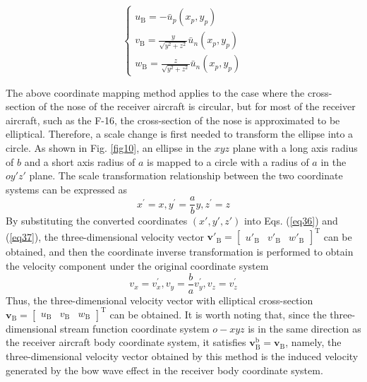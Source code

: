 \begin{equation}\label{eq37}
\left\{\begin{array}{l}
u_{\mathrm{B}}=-\bar{u}_p\left(x_p, y_p\right) \\
v_{\mathrm{B}}=\frac{y}{\sqrt{y^2+z^2}} \bar{u}_n\left(x_p, y_p\right) \\
w_{\mathrm{B}}=\frac{z}{\sqrt{y^2+z^2}} \bar{u}_n\left(x_p, y_p\right)
\end{array}\right.
\end{equation}

The above coordinate mapping method applies to the case where the cross-section of the nose of the receiver aircraft is circular, but for most of the receiver aircraft, such as the F-16, the cross-section of the nose is approximated to be elliptical. Therefore, a scale change is first needed to transform the ellipse into a circle. As shown in Fig. \ref{fig10}, an ellipse in the $xyz$ plane with a long axis radius of $b$ and a short axis radius of $a$ is mapped to a circle with a radius of $a$ in the $oy'z'$ plane. The scale transformation relationship between the two coordinate systems can be expressed as
\begin{equation}\label{eq38}
x^{\prime}=x, y^{\prime}=\frac{a}{b} y, z^{\prime}=z
\end{equation}
By substituting the converted coordinates $\left( {x',y',z'} \right)$ into Eqs. (\ref{eq36}) and (\ref{eq37}), the three-dimensional velocity vector ${\mathbf{v'}_\mathrm{B}} ={\left[{\begin{array}{*{20}{c}}{{{u'}_\mathrm{B}}}&{{{v'}_\mathrm{B}}}&{{{w'}_\mathrm{B}}}\end{array}} \right]^\mathrm{T}}$ can be obtained, and then the coordinate inverse transformation is performed to obtain the velocity component under the original coordinate system 
\begin{equation}\label{eq39}
v_x=v_x^{\prime}, v_y=\frac{b}{a} v_y^{\prime}, v_z=v_z^{\prime}
\end{equation}
Thus, the three-dimensional velocity vector with elliptical cross-section ${\mathbf{v}_\mathrm{B}}={\left[{\begin{array}{*{20}{c}}{{u_\mathrm{B}}}&{{v_\mathrm{B}}}&{{w_\mathrm{B}}}\end{array}} \right]^\mathrm{T}}$ can be obtained. It is worth noting that, since the three-dimensional stream function coordinate system $o-xyz$ is in the same direction as the receiver aircraft body coordinate system, it satisfies $\mathbf{v}_\mathrm{B}^\mathrm{b}=\mathbf{v}_\mathrm{B}$, namely, the three-dimensional velocity vector obtained by this method is the induced velocity generated by the bow wave effect in the receiver body coordinate system.
